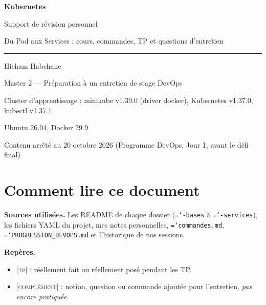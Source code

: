 \documentclass[11pt,a4paper]{article}
\newcommand{\cmd}[1]{\texttt{\hyphenchar\font=`\-#1}}
\newcommand{\tp}{\textsc{[tp]}}
\newcommand{\compl}{\textsc{[complément]}}
\begin{document}
\begin{titlepage}
\centering
\vspace*{5cm}
{\Huge\bfseries Kubernetes\par}
\vspace{0.4cm}
{\Large Support de révision personnel\par}
\vspace{0.3cm}
{\large Du Pod aux Services : cours, commandes, TP et questions d'entretien\par}
\vspace{1.5cm}
\rule{0.6\linewidth}{0.4pt}\par
\vspace{0.8cm}
{\large Hicham Habchane\par}
\vspace{0.2cm}
Master 2 --- Préparation à un entretien de stage DevOps\par
\vfill
{\small Cluster d'apprentissage : minikube v1.39.0 (driver docker), Kubernetes v1.37.0, kubectl v1.37.1\par
Ubuntu 26.04, Docker 29.9\par
\vspace{0.3cm}
Contenu arrêté au 20 octobre 2026 (Programme DevOps, Jour 1, avant le défi final)\par}
\end{titlepage}

\tableofcontents
\clearpage

\section*{Comment lire ce document}

\textbf{Sources utilisées.} Les README de chaque dossier (\cmd{01-bases} à \cmd{06-services}), les fichiers YAML du projet, mes notes personnelles, \cmd{commandes.md}, \cmd{PROGRESSION\_DEVOPS.md} et l'historique de nos sessions.

\textbf{Repères.}
\begin{itemize}
  \item \tp{} : réellement fait ou réellement posé pendant les TP.
  \item \compl{} : notion, question ou commande ajoutée pour l'entretien, \emph{pas encore pratiquée}.
\end{itemize}
\end{document}
